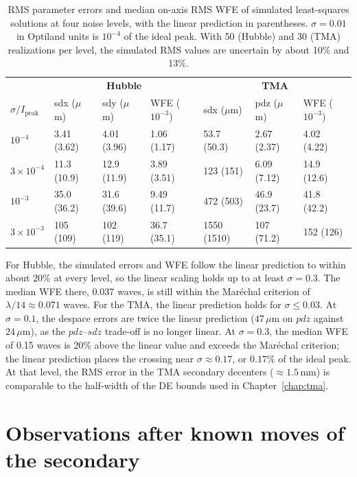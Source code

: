 \begin{table}
\centering
\small
\caption[Parameter errors and WFE versus noise level.]{RMS parameter errors and median on-axis RMS WFE of simulated least-squares solutions at four noise levels, with the linear prediction in parentheses. $\sigma=0.01$ in Optiland units is $10^{-4}$ of the ideal peak. With 50 (Hubble) and 30 (TMA) realizations per level, the simulated RMS values are uncertain by about 10\% and 13\%.}
\label{tab:noise_sweep}
\begin{tabular}{lllllll}
\hline
 & \multicolumn{3}{c}{\textbf{Hubble}} & \multicolumn{3}{c}{\textbf{TMA}} \\
$\sigma/I_{\mathrm{peak}}$ & sdx ($\mu$m) & sdy ($\mu$m) & WFE ($10^{-3}$) & sdx ($\mu$m) & pdz ($\mu$m) & WFE ($10^{-3}$) \\
\hline
$10^{-4}$ & 3.41 (3.62) & 4.01 (3.96) & 1.06 (1.17) & 53.7 (50.3) & 2.67 (2.37) & 4.02 (4.22) \\
$3\times10^{-4}$ & 11.3 (10.9) & 12.9 (11.9) & 3.89 (3.51) & 123 (151) & 6.09 (7.12) & 14.9 (12.6) \\
$10^{-3}$ & 35.0 (36.2) & 31.6 (39.6) & 9.49 (11.7) & 472 (503) & 46.9 (23.7) & 41.8 (42.2) \\
$3\times10^{-3}$ & 105 (109) & 102 (119) & 36.7 (35.1) & 1550 (1510) & 107 (71.2) & 152 (126) \\
\hline
\end{tabular}
\end{table}

For Hubble, the simulated errors and WFE follow the linear prediction to within about 20\% at every level, so the linear scaling holds up to at least $\sigma=0.3$. The median WFE there, 0.037 waves, is still within the Mar{\'e}chal criterion of $\lambda/14\approx0.071$ waves. For the TMA, the linear prediction holds for $\sigma\le0.03$. At $\sigma=0.1$, the despace errors are twice the linear prediction ($47\,\mu\mathrm{m}$ on $pdz$ against $24\,\mu\mathrm{m}$), as the $pdz$--$sdz$ trade-off is no longer linear. At $\sigma=0.3$, the median WFE of 0.15 waves is 20\% above the linear value and exceeds the Mar{\'e}chal criterion; the linear prediction places the crossing near $\sigma\approx0.17$, or $0.17\%$ of the ideal peak. At that level, the RMS error in the TMA secondary decenters ($\approx1.5$\,mm) is comparable to the half-width of the DE bounds used in Chapter~\ref{chap:tma}.

\section{Observations after known moves of the secondary}\label{sec:noise_moves}

